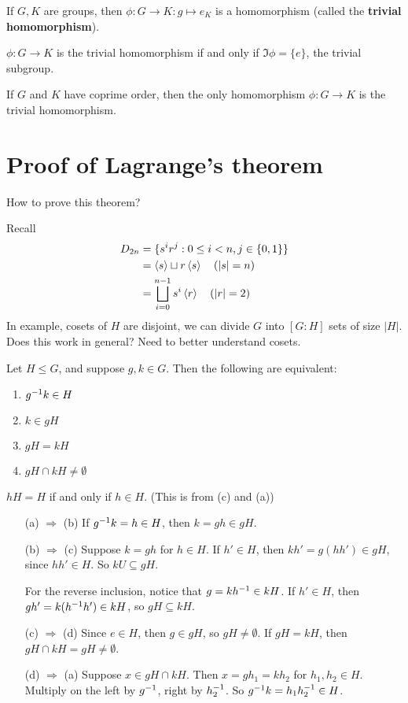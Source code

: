\begin{exercise}
If $G,K$ are groups, then $\phi:G\to K:g\mapsto e_K$ is a homomorphism (called the \textbf{trivial homomorphism}).

$\phi:G\to K$ is the trivial homomorphism if and only if $\Im\phi=\{e\}$, the trivial subgroup.
\end{exercise}

\begin{corr}
If $G$ and $K$ have coprime order, then the only homomorphism $\phi:G\to K$ is the trivial homomorphism.
\end{corr}
\section{Proof of Lagrange's theorem}
How to prove this theorem?

Recall 
$$
\begin{aligned}
D_{2n}&= \{s^ir^j: 0\le i < n, j \in \{0,1\}\}\\
&= \left\langle s \right\rangle \sqcup r\left\langle s \right\rangle \quad (|s|=n)\\
&= \bigsqcup_{i=0}^{n-1}s^i \left\langle r \right\rangle \quad (|r|=2)
\end{aligned}
$$
In example, cosets of $H$ are disjoint, we can divide $G$ into $[G:H]$ sets of size $|H|$. Does this work in general? Need to better understand cosets.

\begin{prop}
Let $H\le G$, and suppose $g,k\in G$. Then the following are equivalent:
\begin{enumerate}[label=(\alph*)]
\item $g^{-1} k\in H$
\item $k\in gH$
\item $gH=kH$
\item $gH\cap kH\ne \emptyset$
\end{enumerate}
\end{prop}

\begin{ex}
$hH=H$ if and only if $h\in H$. (This is from (c) and (a))
\end{ex}

\begin{pf}
\begin{itemize}[leftmargin=4.4em]
\item[(a) $\Rightarrow$ (b)] If $g^{-1} k = h\in H$, then $k=gh\in gH$.
\item[(b) $\Rightarrow$ (c)] Suppose $k=gh$ for $h\in H$. If $h'\in H$, then $kh'=g(hh')\in gH$, since $hh'\in H$. So $kU\subseteq gH$. 

For the reverse inclusion, notice that $g=kh^{-1} \in kH$. If $h'\in H$, then $gh' = k(h^{-1} h')\in kH$, so $gH\subseteq kH$.
\item[(c) $\Rightarrow$ (d)] Since $e\in H$, then $g\in gH$, so $gH\ne \emptyset$. If $gH=kH$, then $gH\cap kH= gH\ne \emptyset$.
\item[(d) $\Rightarrow$ (a)] Suppose $x\in gH\cap kH$. Then $x=gh_1 = kh_2$ for $h_1,h_2\in H$. Multiply on the left by $g^{-1}$, right by $h_2^{-1}$. So $g^{-1} k = h_1h_2^{-1}\in H$.
\end{itemize}
\end{pf}

